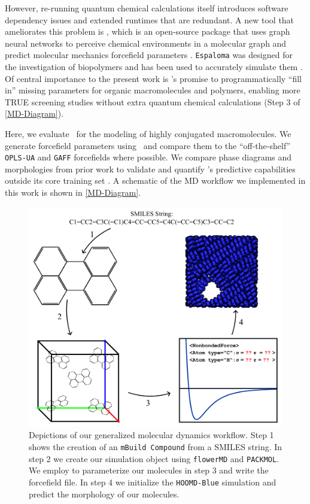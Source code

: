 However, re-running quantum chemical calculations itself introduces software dependency issues and extended runtimes that are redundant.
A new tool that ameliorates this problem is \esp, which is an open-source package that uses graph neural networks to perceive chemical environments in a molecular graph and predict molecular mechanics forcefield parameters \citep{wang_end--end_2022}. 
\texttt{Espaloma} was designed for the investigation of biopolymers and has been used to accurately simulate them \citep{shirts2023, takaba_machine-learned_2024}. 
Of central importance to the present work is \esp's promise to programmatically ``fill in'' missing parameters for organic macromolecules and polymers, enabling more TRUE screening studies without extra quantum chemical calculations (Step 3 of \autoref{MD-Diagram}).

Here, we evaluate \esp~for the modeling of highly conjugated macromolecules.  
We generate forcefield parameters using \esp~and compare them to the ``off-the-shelf'' \texttt{OPLS-UA} and \texttt{GAFF} forcefields where possible.
We compare phase diagrams and morphologies from prior work to validate and quantify \esp's predictive capabilities outside its core training set \citep{wang_end--end_2022}. 
A schematic of the MD workflow we implemented in this work is shown in \autoref{MD-Diagram}. 
\begin{figure}
    \centering
    \includegraphics[width=.6\linewidth]{src/figures/FF_figs/MD_process.png}
    \caption{Depictions of our generalized molecular dynamics workflow. Step 1 shows the creation of an \texttt{mBuild Compound} from a SMILES string. In step 2 we create our simulation object using \texttt{flowerMD} and \texttt{PACKMOL}. We employ \esp to parameterize our molecules in step 3 and write the forcefield file. In step 4 we initialize the \texttt{HOOMD-Blue} simulation and predict the morphology of our molecules.}
    \label{MD-Diagram}
\end{figure}



